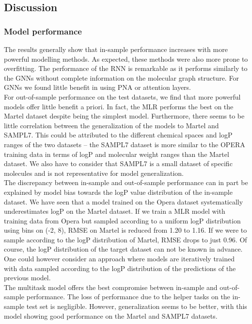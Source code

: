 \documentclass{article}
\begin{document}
\subsection{Discussion}

\subsubsection{Model performance}

The results generally show that in-sample performance increases with more powerful modelling methods. As expected, these methods were also more prone to overfitting. The performance of the RNN is remarkable as it performs similarly to the GNNs without complete information on the molecular graph structure. For GNNs we found little benefit in using PNA or attention layers. \\

For out-of-sample performance on the test datasets, we find that more powerful models offer little benefit a priori. In fact, the MLR performs the best on the Martel dataset despite being the simplest model. Furthermore, there seems to be little correlation between the generalization of the models to Martel and SAMPL7. This could be attributed to the different chemical spaces and logP ranges of the two datasets – the SAMPL7 dataset is more similar to the OPERA training data in terms of logP and molecular weight ranges than the Martel dataset. We also have to consider that SAMPL7 is a small dataset of specific molecules and is not representative for model generalization. \\

The discrepancy between in-sample and out-of-sample performance can in part be explained by model bias towards the logP value distribution of the in-sample dataset. We have seen that a model trained on the Opera dataset systematically underestimates logP on the Martel dataset. If we train a MLR model with training data from Opera but sampled according to a uniform logP distribution using bins on (-2, 8), RMSE on Martel is reduced from 1.20 to 1.16. If we were to sample according to the logP distribution of Martel, RMSE drops to just 0.96. Of course, the logP distribution of the target dataset can not be known in advance. One could however consider an approach where models are iteratively trained with data sampled according to the logP distribution of the predictions of the previous model.\\

The multitask model offers the best compromise between in-sample and out-of-sample performance. The loss of performance due to the helper tasks on the in-sample test set is negligible. However, generalization seems to be better, with this model showing good performance on the Martel and SAMPL7 datasets. \\
\end{document}
